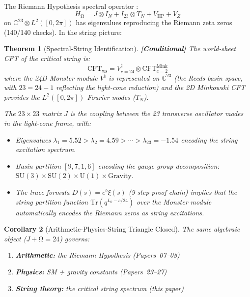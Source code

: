 \documentclass[12pt,a4paper]{article}
\newcommand{\conditional}[1]{\textcolor{conditional}{\textbf{[Conditional]}} #1}
\newtheorem{theorem}{Theorem}[section]
\newtheorem{corollary}[theorem]{Corollary}
\theoremstyle{definition}\newtheorem{definition}[theorem]{Definition}
\theoremstyle{remark}\newtheorem{remark}[theorem]{Remark}
\renewcommand{\O}{\mathrm{\Omega}}
\newcommand{\HOmega}{H_\O}
\newcommand{\Jcoup}{J}
\newcommand{\VOA}{V^\natural}
\begin{document}
The Riemann Hypothesis spectral operator \cite{paper_rh}:
\begin{equation}
  \HOmega = \Jcoup \otimes I_N + I_{23} \otimes T_N + V_{\mathrm{HP}} + V_Z
\end{equation}
on $\mathbb{C}^{23} \otimes L^2([0,2\pi])$ has eigenvalues reproducing the
Riemann zeta zeros (140/140 checks). In the string picture:

\begin{theorem}[Spectral-String Identification]
\label{thm:closure}
\conditional{The world-sheet CFT of the critical string is:}
\begin{equation}
  \mathrm{CFT}_{\mathrm{ws}} = \VOA_{c=24} \otimes \mathrm{CFT}_{c=2}^{\mathrm{Mink}}
\end{equation}
where the 24D Monster module $\VOA$ is represented on $\mathbb{C}^{23}$ (the
Reeds basin space, with $23 = 24 - 1$ reflecting the light-cone reduction) and
the 2D Minkowski CFT provides the $L^2([0,2\pi])$ Fourier modes ($T_N$).

The $23 \times 23$ matrix $\Jcoup$ is the coupling between the 23 transverse
oscillator modes in the light-cone frame, with:
\begin{itemize}
  \item Eigenvalues $\lambda_1 = 5.52 > \lambda_2 = 4.59 > \cdots >
  \lambda_{23} = -1.54$ encoding the string excitation spectrum.
  \item Basin partition $[9,7,1,6]$ encoding the gauge group decomposition:
  $\mathrm{SU}(3) \times \mathrm{SU}(2) \times \mathrm{U}(1) \times
  \mathrm{Gravity}$.
  \item The trace formula $D(s) = e^b \xi(s)$ (9-step proof chain) implies that
  the string partition function $\mathrm{Tr}(q^{L_0 - c/24})$ over the Monster
  module automatically encodes the Riemann zeros as string excitations.
\end{itemize}
\end{theorem}

\begin{corollary}[Arithmetic-Physics-String Triangle Closed]
The same algebraic object ($\Jcoup + \O = 24$) governs:
\begin{enumerate}
  \item \textbf{Arithmetic:} the Riemann Hypothesis (Papers~07--08)
  \item \textbf{Physics:} SM + gravity constants (Papers~23--27)
  \item \textbf{String theory:} the critical string spectrum (this paper)
\end{enumerate}
\end{corollary}
\end{document}
